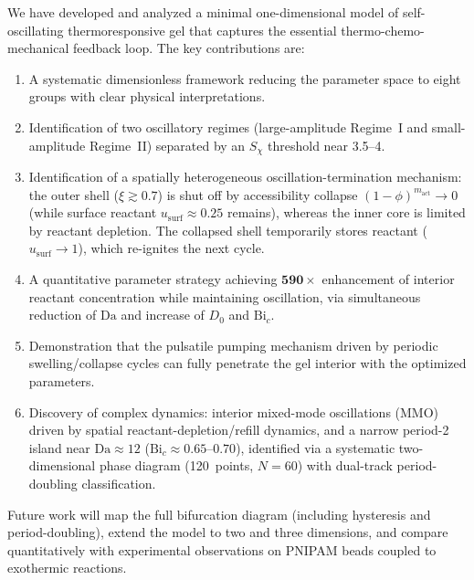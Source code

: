 \documentclass[aps,pre,reprint,superscriptaddress,longbibliography,floatfix]{revtex4-2}
\newcommand{\Da}{\mathrm{Da}}
\newcommand{\Bi}{\mathrm{Bi}}
\begin{document}
We have developed and analyzed a minimal one-dimensional model of
self-oscillating thermoresponsive gel that captures the essential
thermo-chemo-mechanical feedback loop. The key contributions are:
\begin{enumerate}
  \item A systematic dimensionless framework reducing the parameter space
    to eight groups with clear physical interpretations.
  \item Identification of two oscillatory regimes (large-amplitude
    Regime~I and small-amplitude Regime~II) separated by an $S_\chi$
    threshold near 3.5--4.
  \item Identification of a spatially heterogeneous oscillation-termination
    mechanism: the outer shell ($\xi\gtrsim 0.7$) is shut off by
    accessibility collapse $(1-\phi)^{m_\mathrm{act}}\to 0$ (while surface
    reactant $u_\mathrm{surf}\approx 0.25$ remains), whereas the inner core
    is limited by reactant depletion. The collapsed shell temporarily stores
    reactant ($u_\mathrm{surf}\to 1$), which re-ignites the next cycle.
  \item A quantitative parameter strategy achieving $\mathbf{590\times}$
    enhancement of interior reactant concentration while maintaining
    oscillation, via simultaneous reduction of $\Da$ and increase of
    $D_0$ and $\Bi_c$.
  \item Demonstration that the pulsatile pumping mechanism driven by
    periodic swelling/collapse cycles can fully penetrate the gel interior
    with the optimized parameters.
  \item Discovery of complex dynamics: interior mixed-mode oscillations
    (MMO) driven by spatial reactant-depletion/refill dynamics, and a
    narrow period-2 island near $\Da\approx12$ ($\Bi_c\approx0.65$--$0.70$),
    identified via a systematic two-dimensional phase diagram
    (120~points, $N=60$) with dual-track period-doubling classification.
\end{enumerate}

Future work will map the full bifurcation diagram (including hysteresis
and period-doubling), extend the model to two and three dimensions, and
compare quantitatively with experimental observations on PNIPAM beads
coupled to exothermic reactions.

\begin{acknowledgments}
\end{acknowledgments}
\end{document}
